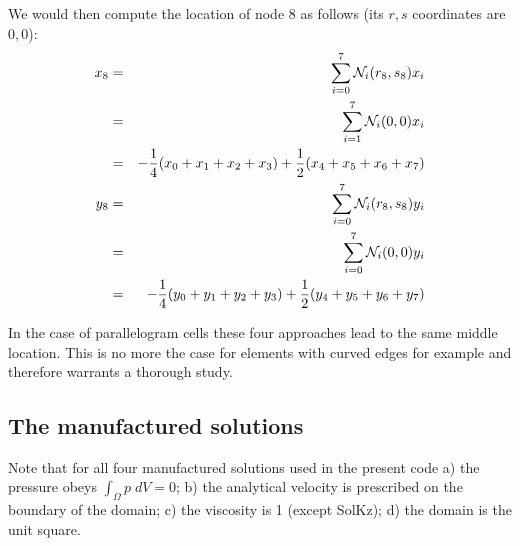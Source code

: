 \begin{itemize}
We would then compute the location of node 8 as follows (its $r,s$ coordinates are $0,0$): 
\begin{eqnarray}
x_8
&=& \sum_{i=0}^7 {\mathcal{N}}_i (r_8,s_8) x_i \nonumber\\
&=& \sum_{i=1}^7 {\mathcal{N}}_i (0,0) x_i \nonumber\\
&=& -\frac14 (x_0+x_1+x_2+x_3) + \frac12 (x_4+x_5+x_6+x_7) \nonumber\\
y_8 
&=& \sum_{i=0}^7 {\mathcal{N}}_i (r_8,s_8) y_i \nonumber\\
&=& \sum_{i=0}^7 {\mathcal{N}}_i (0,0) y_i \nonumber\\
&=& -\frac14 (y_0+y_1+y_2+y_3) + \frac12 (y_4+y_5+y_6+y_7) \nonumber
\end{eqnarray}

\end{itemize}

In the case of parallelogram cells these four approaches lead to the same 
middle location. This is no more the case for elements with curved edges
for example and therefore warrants a thorough study.

\subsection*{The manufactured solutions}

Note that for all four manufactured solutions used in the present code 
a) the pressure obeys $\int_{\Omega} p \; dV = 0$;
b) the analytical velocity is prescribed on the boundary of the domain; 
c) the viscosity is 1 (except SolKz); d) the domain is the unit square. 

